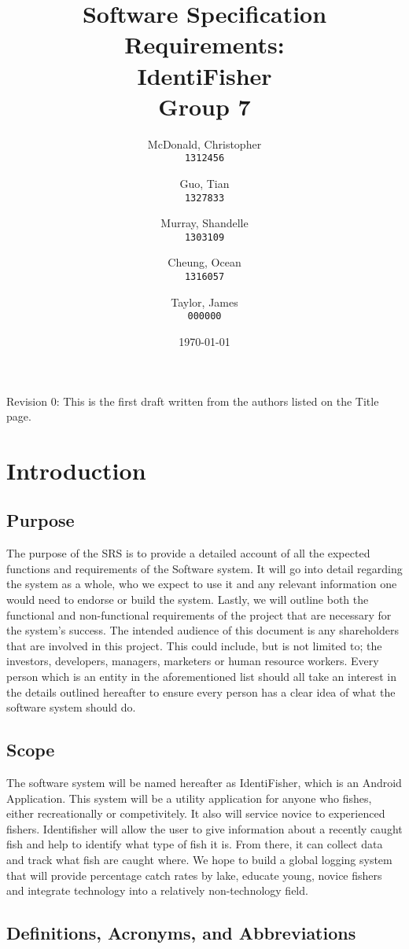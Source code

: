 \documentclass{article}
\title{Software Specification Requirements: \\ IdentiFisher \\ Group 7}
\author{
McDonald, Christopher\\
\texttt{1312456}
\and
Guo, Tian\\
\texttt{1327833}
\and
Murray, Shandelle\\
\texttt{1303109}
\and
Cheung, Ocean\\
\texttt{1316057}
\and
Taylor, James\\
\texttt{000000}
}
\date{\today}
\begin{document}
\maketitle

\newpage
\tableofcontents
Revision 0: This is the first draft written from the authors listed on the Title page.
\newpage
\section{Introduction}

\subsection{Purpose}
The purpose of the SRS is to provide a detailed account of all the expected functions
and requirements of the Software system. It will go into detail regarding the system
as a whole, who we expect to use it and any relevant information one would need
to endorse or build the system. Lastly, we will outline both the functional and
non-functional requirements of the project that are necessary for the system's
success. The intended audience of this document is any shareholders that are involved in this
project. This could include, but is not limited to; the investors, developers, managers,
marketers or human resource workers. Every person which is an entity in the aforementioned
list should all take an interest in the details outlined hereafter to ensure every person
has a clear idea of what the software system should do.

\subsection{Scope}
The software system will be named hereafter as IdentiFisher, which is an Android Application.
This system will be a utility application for anyone who fishes, either recreationally or
competivitely. It also will service novice to experienced fishers. Identifisher will allow
the user to give information about a recently caught fish and help to identify what type
of fish it is. From there, it can collect data and track what fish are caught where. We
hope to build a global logging system that will provide percentage catch rates by lake,
educate young, novice fishers and integrate technology into a relatively non-technology field.


\subsection{Definitions, Acronyms, and Abbreviations}
\end{document}
